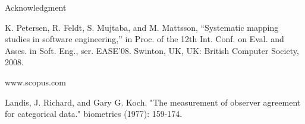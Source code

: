 \documentclass[letterpaper, 10 pt, conference]{ieeeconf}  %
\begin{document}
Acknowledgment


\begin{thebibliography}{99}

 K. Petersen, R. Feldt, S. Mujtaba, and M. Mattsson, “Systematic mapping studies in software engineering,” in Proc. of the 12th Int. Conf. on Eval. and Asses. in Soft. Eng., ser. EASE’08. Swinton, UK, UK: British Computer Society, 2008.

 www.scopus.com

 Landis, J. Richard, and Gary G. Koch. "The measurement of observer agreement for categorical data." biometrics (1977): 159-174.









\end{thebibliography}
\end{document}

